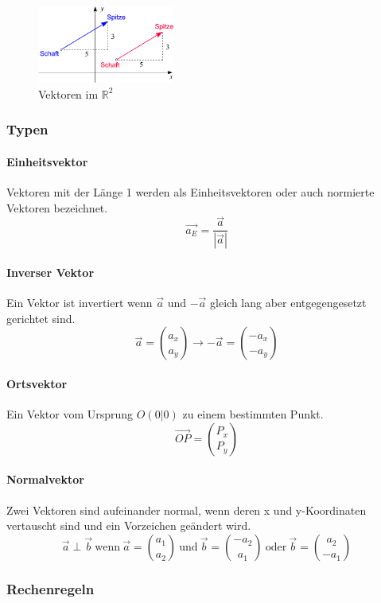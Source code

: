 \documentclass{school}
\begin{document}
\begin{figure}[hh]
    \centering
    \includegraphics[width=0.4\textwidth]{vektor1.png}
    \caption[http://www.mathe-online.at/mathint/vect1/grafiken/vektor1.gif]{Vektoren im $\mathbb{R}^2$}
    \label{fig:vektor}
\end{figure}

\subsubsection{Typen}
\paragraph{Einheitsvektor}
Vektoren mit der Länge 1 werden als Einheitsvektoren oder auch normierte Vektoren bezeichnet.
$$\vec{a_E} = \frac{\vec{a}}{|\vec{a}|}$$

\paragraph{Inverser Vektor}
Ein Vektor ist invertiert wenn $\vec{a}$ und $-\vec{a}$ gleich lang aber entgegengesetzt gerichtet sind.
$$\vec{a} = \binom{a_x}{a_y} \to -\vec{a} = \binom{-a_x}{-a_y}$$

\paragraph{Ortsvektor}
Ein Vektor vom Ursprung $O(0|0)$ zu einem bestimmten Punkt.
$$\overrightarrow{OP} = \binom{P_x}{P_y}$$

\paragraph{Normalvektor}
Zwei Vektoren sind aufeinander normal, wenn deren x und y-Koordinaten vertauscht sind und ein Vorzeichen geändert wird.
$$\vec{a} \perp \vec{b} ~\text{wenn}~ \vec{a} = \binom{a_1}{a_2} ~\text{und}~ \vec{b} = \binom{-a_2}{a_1} ~\text{oder}~ \vec{b} = \binom{a_2}{-a_1}$$

\newpage
\subsubsection{Rechenregeln}
\end{document}
